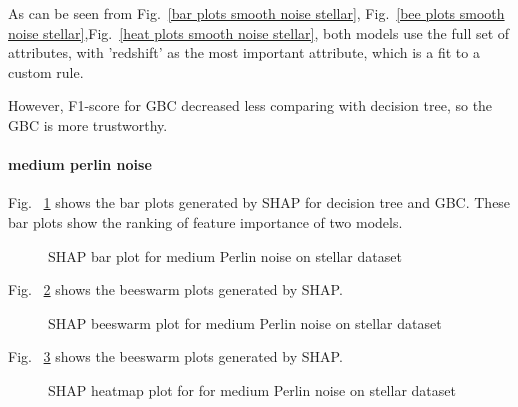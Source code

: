 \documentclass[runningheads,a4paper]{llncs}
\begin{document}
As can be seen from Fig.~\ref{bar plots smooth noise stellar}, Fig.~\ref{bee plots smooth noise stellar},Fig.~\ref{heat plots smooth noise stellar}, 
both models use the full set of attributes, with 'redshift' as the most important attribute, which is a fit to a custom rule.

However, F1-score for GBC decreased less comparing with decision tree, so the GBC is more trustworthy.

\paragraph{medium perlin noise}

Fig. ~\ref{bar plots medium noise stellar} shows the bar plots generated by SHAP for decision tree and GBC. These bar plots show the ranking of feature importance of two models.
\begin{figure}[H]
	\centering
	
	\hfill
	
	
	\caption{SHAP bar plot for medium Perlin noise on stellar dataset}
	\label{bar plots medium noise stellar}
\end{figure}



Fig. ~\ref{bee plots medium noise stellar} shows the beeswarm plots generated by SHAP.
\begin{figure}[H]
	\centering
	
	\hfill
	
	
	\caption{SHAP beeswarm plot for medium Perlin noise on stellar dataset}
	\label{bee plots medium noise stellar}
	
\end{figure}
Fig. ~\ref{heat plots medium noise stellar} shows the beeswarm plots generated by SHAP.
\begin{figure}[H]
	\centering
	
	\hfill
	
	
	\caption{SHAP heatmap plot for for medium Perlin noise  on stellar dataset}
	\label{heat plots medium noise stellar}
	
\end{figure}
\end{document}

